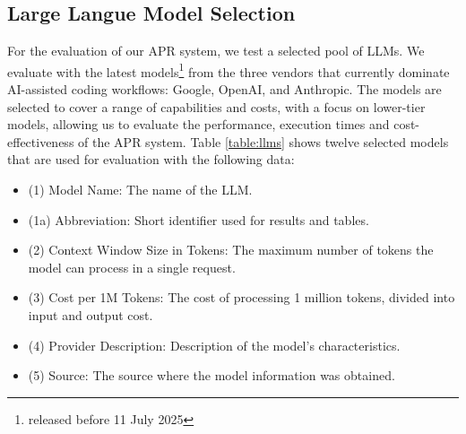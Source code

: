 \subsection{Large Langue Model Selection} \label{subsection:llm-selection}
For the evaluation of our APR system, we test a selected pool of \acp{LLM}. We evaluate with the latest models\footnote{released before 11 July 2025} from the three vendors that currently dominate AI-assisted coding workflows: Google, OpenAI, and Anthropic. %
The models are selected to cover a range of capabilities and costs, with a focus on lower-tier models, allowing us to evaluate the performance, execution times and cost-effectiveness of the APR system. Table \ref{table:llms} shows twelve selected models that are used for evaluation with the following data:
\begin{itemize}
    \item (1) Model Name: The name of the \ac{LLM}.
    \item (1a) Abbreviation: Short identifier used for results and tables.
    \item (2) Context Window Size in Tokens: The maximum number of tokens the model can process in a single request.
    \item (3) Cost per 1M Tokens: The cost of processing 1 million tokens, divided into input and output cost.
    \item (4) Provider Description: Description of the model's characteristics.
    \item (5) Source: The source where the model information was obtained.
\end{itemize}

